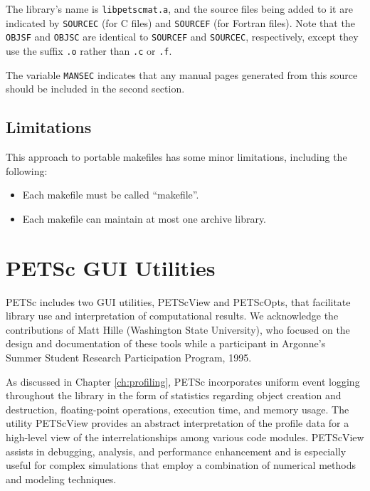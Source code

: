 The library's name is {\tt libpetscmat.a}, and the source files being added
to it are indicated by {\tt SOURCEC} (for C files) and {\tt SOURCEF} (for 
Fortran files). Note that the {\tt OBJSF} and {\tt OBJSC} are identical 
to {\tt SOURCEF} and {\tt SOURCEC}, respectively, except they use the
suffix {\tt .o} rather than {\tt .c} or {\tt .f}. 

The variable {\tt MANSEC} indicates that any manual pages generated
from this source should be included in the second section. 

\section{Limitations}

This approach to portable makefiles has some minor limitations, including
the following:
\begin{itemize}
\item Each makefile must be called ``makefile''.
\item Each makefile can maintain at most one archive library.
\end{itemize}



\chapter{PETSc GUI Utilities}
\label{ch:petsc_gui}

PETSc includes two GUI utilities, PETScView and PETScOpts, that
facilitate library use and interpretation of computational results.
We acknowledge the contributions of Matt Hille (Washington State
University), who focused on the design and documentation of these
tools while a participant in Argonne's Summer Student Research
Participation Program, 1995.

As discussed in Chapter \ref{ch:profiling}, PETSc incorporates uniform
event logging throughout the library in the form of statistics
regarding object creation and destruction, floating-point operations,
execution time, and memory usage.  The utility PETScView provides an
abstract interpretation of the profile data for a high-level view of
the interrelationships among various code modules.  PETScView assists
in debugging, analysis, and performance enhancement and is especially
useful for complex simulations that employ a combination of numerical
methods and modeling techniques.

